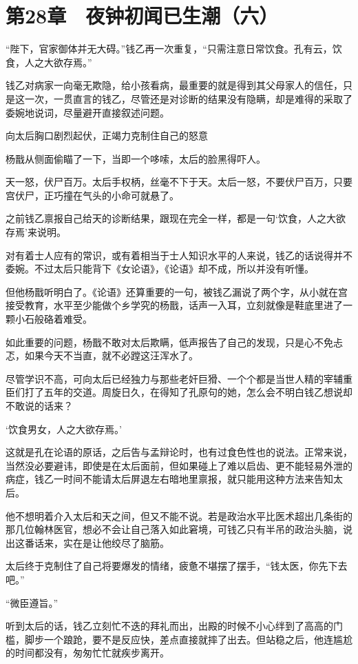 \section{第28章　夜钟初闻已生潮（六）}

“陛下，官家御体并无大碍。”钱乙再一次重复，“只需注意日常饮食。孔有云，饮食，人之大欲存焉。”

钱乙对病家一向毫无欺隐，给小孩看病，最重要的就是得到其父母家人的信任，只是这一次，一贯直言的钱乙，尽管还是对诊断的结果没有隐瞒，却是难得的采取了委婉地说词，尽量避开直接叙述问题。

向太后胸口剧烈起伏，正竭力克制住自己的怒意

杨戬从侧面偷瞄了一下，当即一个哆嗦，太后的脸黑得吓人。

天一怒，伏尸百万。太后手权柄，丝毫不下于天。太后一怒，不要伏尸百万，只要宫伏尸，正巧撞在气头的小命可就悬了。

之前钱乙禀报自己给天的诊断结果，跟现在完全一样，都是一句‘饮食，人之大欲存焉’来说明。

对有着士人应有的常识，或有着相当于士人知识水平的人来说，钱乙的话说得并不委婉。不过太后只能背下《女论语》，《论语》却不成，所以并没有听懂。

但他杨戬听明白了。《论语》还算重要的一句，被钱乙漏说了两个字，从小就在宫接受教育，水平至少能做个乡学究的杨戬，话声一入耳，立刻就像是鞋底里进了一颗小石般硌着难受。

如此重要的问题，杨戬不敢对太后欺瞒，低声报告了自己的发现，只是心不免忐忑，如果今天不当直，就不必蹚这汪浑水了。

尽管学识不高，可向太后已经独力与那些老奸巨猾、一个个都是当世人精的宰辅重臣们打了五年的交道。周旋日久，在得知了孔原句的她，怎么会不明白钱乙想说却不敢说的话来？

‘饮食男女，人之大欲存焉。’

这就是孔在论语的原话，之后告与孟辩论时，也有过食色性也的说法。正常来说，当然没必要避讳，即使是在太后面前，但如果碰上了难以启齿、更不能轻易外泄的病症，钱乙一时间不能请太后屏退左右暗地里禀报，就只能用这种方法来告知太后。

他不想明着介入太后和天之间，但又不能不说。若是政治水平比医术超出几条街的那几位翰林医官，想必不会让自己落入如此窘境，可钱乙只有半吊的政治头脑，说出这番话来，实在是让他绞尽了脑筋。

太后终于克制住了自己将要爆发的情绪，疲惫不堪摆了摆手，“钱太医，你先下去吧。”

“微臣遵旨。”

听到太后的话，钱乙立刻忙不迭的拜礼而出，出殿的时候不小心绊到了高高的门槛，脚步一个踉跄，要不是反应快，差点直接就摔了出去。但站稳之后，他连尴尬的时间都没有，匆匆忙忙就疾步离开。

